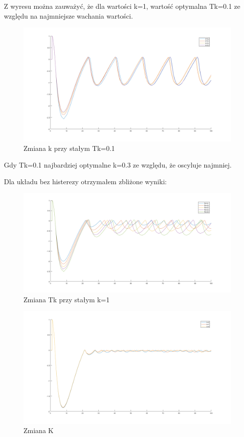 \documentclass[a4paper,10pt]{article}
\begin{document}
\begin{enumerate}
Z wyresu można zauważyć, że dla wartości k=1, wartość optymalna Tk=0.1 ze względu na najmniejsze wachania wartości.

\begin{figure}[!h]
    \centering
	\includegraphics[width=120mm]{dwu_kor_k.png}
	\caption{Zmiana k przy stałym Tk=0.1}
    \label{fig:Rysunek}
\end{figure}
Gdy Tk=0.1 najbardziej optymalne k=0.3 ze względu, że oscyluje najmniej.
\newpage

Dla układu bez histerezy otrzymałem zbliżone wyniki:
\begin{figure}[!h]
    \centering
	\includegraphics[width=120mm]{dwu_kor_tk_bez.png}
	\caption{Zmiana Tk przy stałym k=1}
    \label{fig:Rysunek}
\end{figure}

\begin{figure}[!h]
    \centering
	\includegraphics[width=120mm]{dwu_kor_k_bez.png}
	\caption{Zmiana K}
    \label{fig:Rysunek}
\end{figure}



\end{enumerate}
\end{document}
